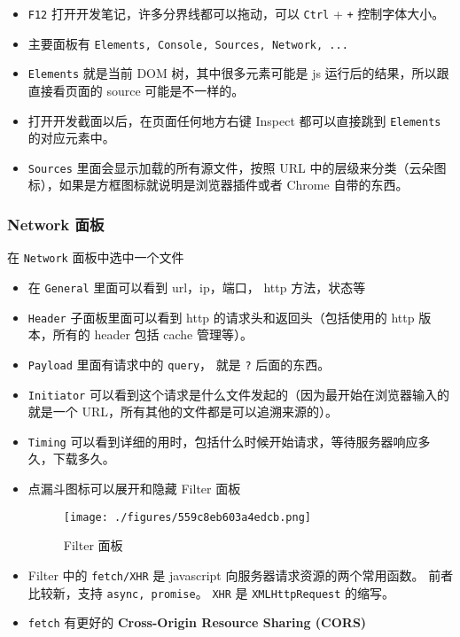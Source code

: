 

\begin{issues}
\issueDraft
\end{issues}

\begin{itemize}
\item \verb`F12` 打开开发笔记，许多分界线都可以拖动，可以 \verb`Ctrl` + \verb`+` 控制字体大小。
\item 主要面板有 \verb`Elements, Console, Sources, Network, ...`
\item \verb`Elements` 就是当前 DOM 树，其中很多元素可能是 js 运行后的结果，所以跟直接看页面的 source 可能是不一样的。
\item 打开开发截面以后，在页面任何地方右键 Inspect 都可以直接跳到 \verb`Elements` 的对应元素中。
\item \verb`Sources` 里面会显示加载的所有源文件，按照 URL 中的层级来分类（云朵图标），如果是方框图标就说明是浏览器插件或者 Chrome 自带的东西。
\end{itemize}

\subsubsection{Network 面板}
在 \verb`Network` 面板中选中一个文件
\begin{itemize}
\item 在 \verb`General` 里面可以看到 url，ip，端口， http 方法，状态等
\item \verb`Header` 子面板里面可以看到 http 的请求头和返回头（包括使用的 http 版本，所有的 header 包括 cache 管理等）。
\item \verb`Payload` 里面有请求中的 \verb`query`， 就是 \verb`?` 后面的东西。
\item \verb`Initiator` 可以看到这个请求是什么文件发起的（因为最开始在浏览器输入的就是一个 URL，所有其他的文件都是可以追溯来源的）。
\item \verb`Timing` 可以看到详细的用时，包括什么时候开始请求，等待服务器响应多久，下载多久。
\item 点漏斗图标可以展开和隐藏 Filter 面板
\begin{figure}[ht]
\centering
\texttt{[image: ./figures/559c8eb603a4edcb.png]}
\caption{Filter 面板} \label{fig_chrmDv_1}
\end{figure}
\item Filter 中的 \verb`fetch/XHR` 是 javascript 向服务器请求资源的两个常用函数。 前者比较新，支持 \verb`async, promise`。 \verb`XHR` 是 \verb`XMLHttpRequest` 的缩写。
\item \verb`fetch` 有更好的 \textbf{Cross-Origin Resource Sharing (CORS)}
\end{itemize}

